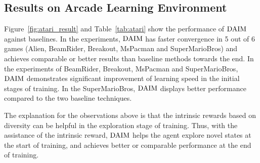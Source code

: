 \subsection{Results on Arcade Learning Environment}

Figure~\ref{fig:atari_result} and Table~\ref{tab:atari} show the performance of $\text{DAIM}$ against baselines. In the experiments, $\text{DAIM}$ has faster convergence in 5 out of 6 games (Alien, BeamRider, Breakout, MsPacman and SuperMarioBros) and achieves comparable or better results than baseline methods towards the end. In the experiments of BeamRider, Breakout, MsPacman and SuperMarioBros, $\text{DAIM}$ demonstrates significant improvement of learning speed in the initial stages of training. In the SuperMarioBros, $\text{DAIM}$ displays better performance compared to the two baseline techniques.

The explanation for the observations above is that the intrinsic rewards based on diversity can be helpful in the exploration stage of training. Thus, with the assistance of the intrinsic reward, $\text{DAIM}$ helps the agent explore novel states at the start of training, and achieves better or comparable performance at the end of training.

